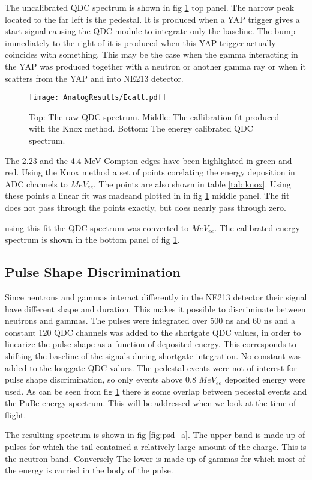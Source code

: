 \documentclass[main.tex]{subfiles}
\begin{document}
The uncalibrated QDC spectrum is shown in fig \ref{fig:qdc_a} top panel. The narrow peak located to the far left is the pedestal. It is produced when a YAP trigger gives a start signal causing the QDC module to integrate only the baseline. The bump immediately to the right of it is produced when this YAP trigger actually coincides with something. This may be the case when the gamma interacting in the YAP was produced together with a neutron or another gamma ray or when it scatters from the YAP and into NE213 detector.
\begin{figure}[ht!]
    \centering
        \texttt{[image: AnalogResults/Ecall.pdf]}
        \caption{Top: The raw QDC spectrum. Middle: The callibration fit produced with the Knox method. Bottom: The energy calibrated QDC spectrum.}
    \label{fig:qdc_a}
\end{figure}
\clearpage
The 2.23 and the 4.4 MeV Compton edges have been highlighted in green and red. Using the Knox method a set of points corelating the energy deposition in ADC channels to $MeV_{ee}$. The points are also shown in table \ref{tab:knox}. Using these points a linear fit was madeand plotted in in fig \ref{fig:qdc_a} middle panel. The fit does not pass through the points exactly, but does nearly pass through zero.

using this fit the QDC spectrum was converted to $MeV_{ee}$. The calibrated energy spectrum is shown in the bottom panel of fig \ref{fig:qdc_a}.

\subsection{Pulse Shape Discrimination}
Since neutrons and gammas interact differently in the NE213 detector their signal have different shape and duration. This makes it possible to discriminate between neutrons and gammas. The pulses were integrated over 500 ns and 60 ns and a constant 120 QDC channels was added to the shortgate QDC values, in order to linearize the pulse shape as a function of deposited energy. This corresponds to shifting the baseline of the signals during shortgate integration. No constant was added to the longgate QDC values. The pedestal events were not of interest for pulse shape discrimination,  so only events above 0.8 $MeV_{ee}$ deposited energy were used. As can be seen from fig \ref{fig:qdc_a} there is some overlap between pedestal events and the PuBe energy spectrum. This will be addressed when we look at the time of flight.

The resulting spectrum is shown in fig \ref{fig:psd_a}. The upper band is made up of pulses for which the tail contained a relatively large amount of the charge. This is the neutron band. Conversely The lower is made up of gammas for which most of the energy is carried in the body of the pulse. 
\end{document}
